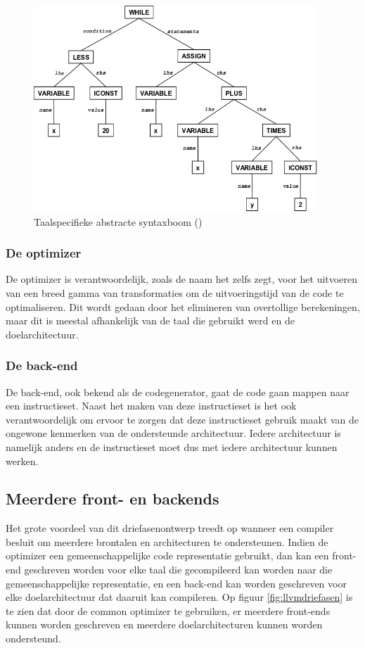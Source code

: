 \begin{figure} [ht]
	\centering
	\includegraphics[width=0.95\textwidth]{img/syntaxtree.png}
	\caption{Taalspecifieke abstracte syntaxboom (\cite{ResearchGate})}
	\label{fig:syntaxtree}
\end{figure}

\subsubsection{De optimizer}
De optimizer is verantwoordelijk, zoals de naam het zelfs zegt, voor het uitvoeren van een breed gamma van transformaties om de uitvoeringstijd van de code te optimaliseren. Dit wordt gedaan door het elimineren van overtollige berekeningen, maar dit is meestal afhankelijk van de taal die gebruikt werd en de doelarchitectuur.

\subsubsection{De back-end}
De back-end, ook bekend als de codegenerator, gaat de code gaan mappen naar een instructieset. Naast het maken van deze instructieset is het ook verantwoordelijk om ervoor te zorgen dat deze instructieset gebruik maakt van de ongewone kenmerken van de ondersteunde architectuur. Iedere architectuur is namelijk anders en de instructieset moet dus met iedere architectuur kunnen werken. 

\subsection{Meerdere front- en backends}
Het grote voordeel van dit driefasenontwerp treedt op wanneer een compiler besluit om meerdere brontalen en architecturen te ondersteunen. Indien de optimizer een gemeenschappelijke code representatie gebruikt, dan kan een front-end geschreven worden voor elke taal die gecompileerd kan worden naar die gemeenschappelijke representatie, en een back-end kan worden geschreven voor elke doelarchitectuur dat daaruit kan compileren. Op figuur \ref{fig:llvmdriefasen} is te zien dat door de common optimizer te gebruiken, er meerdere front-ends kunnen worden geschreven en meerdere doelarchitecturen kunnen worden ondersteund.

